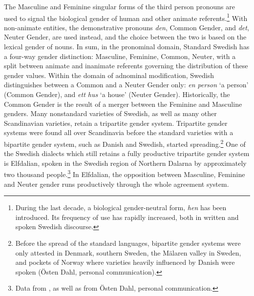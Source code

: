 \documentclass[output=collectionpaper]{langsci/langscibook}
\begin{document}
The Masculine and Feminine singular forms of the third person pronouns are used to signal the biological gender of human and other animate referents.\footnote{During the last decade, a biological gender-neutral form, \textit{hen} has been introduced. Its frequency of use has rapidly increased, both in written and spoken Swedish discourse.} With non-animate entities, the demonstrative pronouns \textit{den}, Common Gender, and \textit{det}, Neuter Gender, are used instead, and the choice between the two is based on the lexical gender of nouns. In sum, in the pronominal domain, Standard Swedish has a four-way gender distinction: Masculine, Feminine, Common, Neuter, with a split between animate and inanimate referents governing the distribution of these gender values.  Within the domain of adnominal modification, Swedish distinguishes between a Common and a Neuter Gender only: \textit{en person} `a person' (Common Gender), and \textit{ett hus} `a house' (Neuter Gender). Historically, the Common Gender is the result of a merger between the Feminine and Masculine genders. Many nonstandard varieties of Swedish, as well as many other Scandinavian varieties, retain a tripartite gender system. Tripartite gender systems were found all over Scandinavia before the standard varieties with a bipartite gender system, such as Danish and Swedish, started spreading.\footnote{Before the spread of the standard languages, bipartite gender systems were only attested in Denmark, southern Sweden, the M\"alaren valley in Sweden, and pockets of Norway where varieties heavily influenced by Danish were spoken (\"Osten Dahl, personal communication).} One of the Swedish dialects which still retains a fully productive tripartite gender system is Elfdalian, spoken in the Swedish region of Northern Dalarna by approximately two thousand people.\footnote{Data from \citet{AAkerberg2012}, as well as from Östen Dahl, personal communication.} In Elfdalian, the opposition between Masculine, Feminine and Neuter gender runs productively through the whole agreement system.
\end{document}
